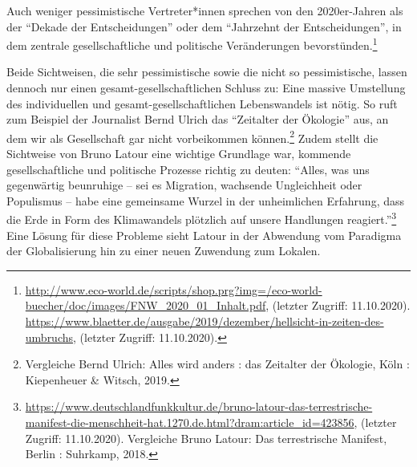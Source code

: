 \documentclass[a4paper,
fontsize=11pt,
oneside,
numbers=noperiodatend,
parskip=half-,
bibliography=totoc,
final
]{scrartcl}
\begin{document}
Auch weniger pessimistische Vertreter*innen sprechen von den
2020er-Jahren als der \enquote{Dekade der Entscheidungen} oder dem
\enquote{Jahrzehnt der Entscheidungen}, in dem zentrale
gesellschaftliche und politische Veränderungen bevorstünden.\footnote{\url{http://www.eco-world.de/scripts/shop.prg?img=/eco-world-buecher/doc/images/FNW_2020_01_Inhalt.pdf},
  (letzter Zugriff: 11.10.2020).
  \url{https://www.blaetter.de/ausgabe/2019/dezember/hellsicht-in-zeiten-des-umbruchs},
  (letzter Zugriff: 11.10.2020).}

Beide Sichtweisen, die sehr pessimistische sowie die nicht so
pessimistische, lassen dennoch nur einen gesamt-gesellschaftlichen
Schluss zu: Eine massive Umstellung des individuellen und
gesamt-gesellschaftlichen Lebenswandels ist nötig. So ruft zum Beispiel
der Journalist Bernd Ulrich das \enquote{Zeitalter der Ökologie} aus, an
dem wir als Gesellschaft gar nicht vorbeikommen können.\footnote{Vergleiche
  Bernd Ulrich: Alles wird anders : das Zeitalter der Ökologie, Köln :
  Kiepenheuer \& Witsch, 2019.} Zudem stellt die Sichtweise von Bruno
Latour eine wichtige Grundlage war, kommende gesellschaftliche und
politische Prozesse richtig zu deuten: \enquote{Alles, was uns
gegenwärtig beunruhige -- sei es Migration, wachsende Ungleichheit oder
Populismus -- habe eine gemeinsame Wurzel in der unheimlichen Erfahrung,
dass die Erde in Form des Klimawandels plötzlich auf unsere Handlungen
reagiert.}\footnote{\url{https://www.deutschlandfunkkultur.de/bruno-latour-das-terrestrische-manifest-die-menschheit-hat.1270.de.html?dram:article_id=423856},
  (letzter Zugriff: 11.10.2020). Vergleiche Bruno Latour: Das
  terrestrische Manifest, Berlin : Suhrkamp, 2018.} Eine Lösung für
diese Probleme sieht Latour in der Abwendung vom Paradigma der
Globalisierung hin zu einer neuen Zuwendung zum Lokalen.
\end{document}
